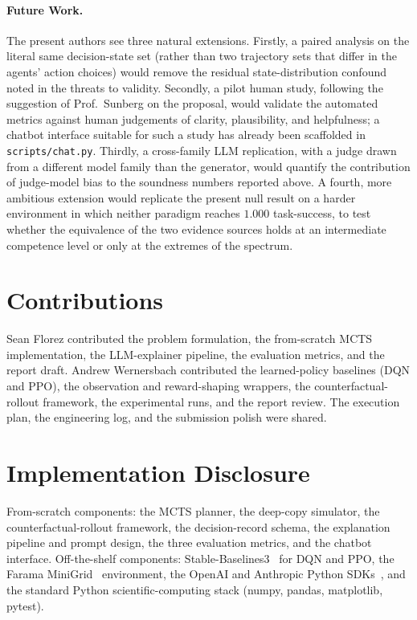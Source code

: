 \documentclass[conference]{IEEEtran}
\begin{document}
\paragraph{Future Work.}
The present authors see three natural extensions. Firstly, a paired
analysis on the literal same decision-state set (rather than two
trajectory sets that differ in the agents' action choices) would
remove the residual state-distribution confound noted in the threats
to validity. Secondly, a pilot human study, following the suggestion
of Prof.\ Sunberg on the proposal, would validate the automated
metrics against human judgements of clarity, plausibility, and
helpfulness; a chatbot interface suitable for such a study has
already been scaffolded in \texttt{scripts/chat.py}. Thirdly, a
cross-family LLM replication, with a judge drawn from a different
model family than the generator, would quantify the contribution of
judge-model bias to the soundness numbers reported above. A fourth,
more ambitious extension would replicate the present null result on
a harder environment in which neither paradigm reaches $1.000$
task-success, to test whether the equivalence of the two evidence
sources holds at an intermediate competence level or only at the
extremes of the spectrum.

\section*{Contributions}
Sean Florez contributed the problem formulation, the from-scratch
MCTS implementation, the LLM-explainer pipeline, the evaluation
metrics, and the report draft. Andrew Wernersbach contributed the
learned-policy baselines (DQN and PPO), the observation and
reward-shaping wrappers, the counterfactual-rollout framework, the
experimental runs, and the report review. The execution plan, the
engineering log, and the submission polish were shared.

\section*{Implementation Disclosure}
From-scratch components: the MCTS planner, the deep-copy simulator,
the counterfactual-rollout framework, the decision-record schema, the
explanation pipeline and prompt design, the three evaluation metrics,
and the chatbot interface. Off-the-shelf components:
Stable-Baselines3~\cite{sb3} for DQN and PPO, the
Farama MiniGrid~\cite{minigrid} environment, the OpenAI and Anthropic
Python SDKs~\cite{openai,anthropic}, and the standard Python
scientific-computing stack (numpy, pandas, matplotlib, pytest).
\end{document}
